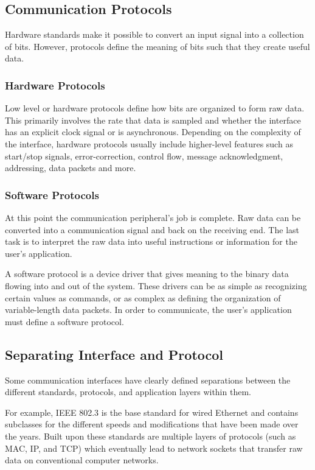 \documentclass[11pt,fleqn]{book} %
\begin{document}
\subsection{Communication Protocols}
Hardware standards make it possible to convert an input signal into a collection of bits. However, protocols define the meaning of bits such that they create useful data. 

\subsubsection{Hardware Protocols}
Low level or hardware protocols define how bits are organized to form raw data. This primarily involves the rate that data is sampled and whether the interface has an explicit clock signal or is asynchronous.
Depending on the complexity of the interface, hardware protocols usually include higher-level features such as start/stop signals, error-correction, control flow, message acknowledgment, addressing, data packets and more.

\subsubsection{Software Protocols}	
At this point the communication peripheral's job is complete. Raw data can be converted into a communication signal and back on the receiving end. The last task is to interpret the raw data into useful instructions or information for the user's application.

A software protocol is a device driver that gives meaning to the binary data flowing into and out of the system. These drivers can be as simple as recognizing certain values as commands, or as complex as defining the organization of variable-length data packets.  In order to communicate, the user's application must define a software protocol. 

\subsection{Separating Interface and Protocol}
   
Some communication interfaces have clearly defined separations between the different standards, protocols, and application layers within them. 

For example, IEEE 802.3 is the base standard for wired Ethernet and contains subclasses for the different speeds and modifications that have been made over the years. Built upon these standards are multiple layers of protocols (such as MAC, IP, and TCP) which eventually lead to network sockets that transfer raw data on conventional computer networks. 
\end{document}
